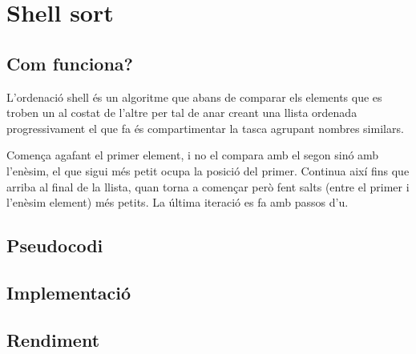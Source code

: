 \chapter{Shell sort}

\section{Com funciona?}
L'ordenació shell és un algoritme que abans de comparar els elements que es troben un al costat de l'altre per tal de anar creant una llista ordenada progressivament el que fa és compartimentar la tasca agrupant nombres similars.

Comença agafant el primer element, i no el compara amb el segon sinó amb l'enèsim, el que sigui més petit ocupa la posició del primer. Continua així fins que arriba al final de la llista, quan torna a començar però fent salts (entre el primer i l'enèsim element) més petits.
La última iteració es fa amb passos d'u.
\section{Pseudocodi}
\section{Implementació}

\section{Rendiment}
